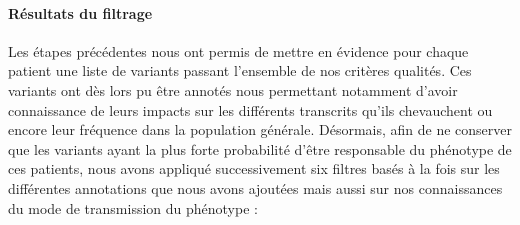 \documentclass[12pt,twoside]{reedthesis}
\theoremstyle{definition}
\theoremstyle{definition}
\theoremstyle{remark}
\begin{document}
  \newpage
  
  \hypertarget{filterdescription}{\paragraph{Résultats du
  filtrage}\label{filterdescription}}
  
  Les étapes précédentes nous ont permis de mettre en évidence pour chaque
  patient une liste de variants passant l'ensemble de nos critères
  qualités. Ces variants ont dès lors pu être annotés nous permettant
  notamment d'avoir connaissance de leurs impacts sur les différents
  transcrits qu'ils chevauchent ou encore leur fréquence dans la
  population générale. Désormais, afin de ne conserver que les variants
  ayant la plus forte probabilité d'être responsable du phénotype de ces
  patients, nous avons appliqué successivement six filtres basés à la fois
  sur les différentes annotations que nous avons ajoutées mais aussi sur
  nos connaissances du mode de transmission du phénotype :
  
\end{document}
